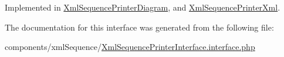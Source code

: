 Implemented in \hyperlink{class_xml_sequence_printer_diagram_7a8a4630e9f25847da0a6de87a5ab7e0}{XmlSequencePrinterDiagram}, and \hyperlink{class_xml_sequence_printer_xml_7a8a4630e9f25847da0a6de87a5ab7e0}{XmlSequencePrinterXml}.

The documentation for this interface was generated from the following file:\begin{CompactItemize}
\item 
components/xmlSequence/\hyperlink{_xml_sequence_printer_interface_8interface_8php}{XmlSequencePrinterInterface.interface.php}\end{CompactItemize}
